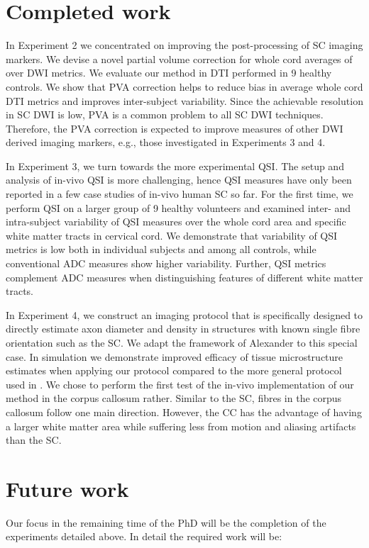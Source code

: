 \section{Completed work}
In Experiment 2 we concentrated on improving the post-processing of {\gls{SC}} imaging markers. We devise a novel partial volume correction for whole cord averages of over {\gls{DWI}} metrics. We evaluate our method in \gls{DTI} performed in 9 healthy controls. We show that PVA correction helps to reduce bias in average whole cord \gls{DTI} metrics and improves inter-subject variability. Since the achievable resolution in {\gls{SC}} DWI is low, PVA is a common problem to all {\gls{SC}} DWI techniques. Therefore, the PVA correction is expected to improve measures of other DWI derived imaging markers, e.g., those investigated in Experiments 3 and 4.


In Experiment 3, we turn towards the more experimental \gls{QSI}. The setup and analysis of in-vivo \gls{QSI} is more challenging, hence \gls{QSI} measures have only been reported in a few case studies of in-vivo human {\gls{SC}} so far. For the first time, we perform \gls{QSI} on a larger group of 9 healthy volunteers and examined inter- and intra-subject variability of \gls{QSI} measures over the whole cord area and specific white matter tracts in cervical cord. We demonstrate that variability of \gls{QSI} metrics is low both in individual subjects and among all controls, while conventional \gls{ADC} measures show higher variability. Further, \gls{QSI} metrics complement \gls{ADC} measures when distinguishing features of different white matter tracts.


In Experiment 4, we construct an imaging protocol that is specifically designed to directly estimate axon diameter and density in structures with known single fibre orientation such as the {\gls{SC}}. We adapt the framework of Alexander\cite{Alexander:2008} to this special case. In simulation we demonstrate improved efficacy of tissue microstructure estimates when applying our protocol compared to the more general protocol used in \cite{Alexander:2010}. We chose to perform the first test of the in-vivo implementation of our method  in the corpus callosum rather. Similar to the {\gls{SC}}, fibres in the corpus callosum follow one main direction. However, the \gls{CC} has the advantage of having a larger white matter area while suffering less from motion and aliasing artifacts than the {\gls{SC}}.

\section{Future work}
Our focus in the remaining time of the PhD will be the completion of the experiments detailed above. In detail the required work will be:
